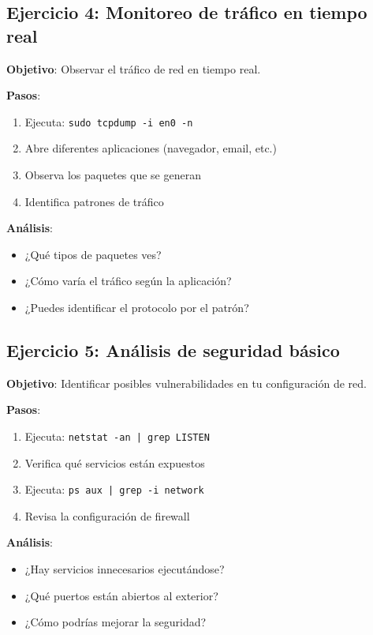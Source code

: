 \begin{itemize}
\subsection{Ejercicio 4: Monitoreo de tráfico en tiempo real}

\textbf{Objetivo}: Observar el tráfico de red en tiempo real.

\textbf{Pasos}:
\begin{enumerate}
    \item Ejecuta: \texttt{sudo tcpdump -i en0 -n}
    \item Abre diferentes aplicaciones (navegador, email, etc.)
    \item Observa los paquetes que se generan
    \item Identifica patrones de tráfico
\end{enumerate}

\textbf{Análisis}:
\begin{itemize}
    \item ¿Qué tipos de paquetes ves?
    \item ¿Cómo varía el tráfico según la aplicación?
    \item ¿Puedes identificar el protocolo por el patrón?
\end{itemize}

\subsection{Ejercicio 5: Análisis de seguridad básico}

\textbf{Objetivo}: Identificar posibles vulnerabilidades en tu configuración de red.

\textbf{Pasos}:
\begin{enumerate}
    \item Ejecuta: \texttt{netstat -an | grep LISTEN}
    \item Verifica qué servicios están expuestos
    \item Ejecuta: \texttt{ps aux | grep -i network}
    \item Revisa la configuración de firewall
\end{enumerate}

\textbf{Análisis}:
\begin{itemize}
    \item ¿Hay servicios innecesarios ejecutándose?
    \item ¿Qué puertos están abiertos al exterior?
    \item ¿Cómo podrías mejorar la seguridad?
\end{itemize}


\end{itemize}
